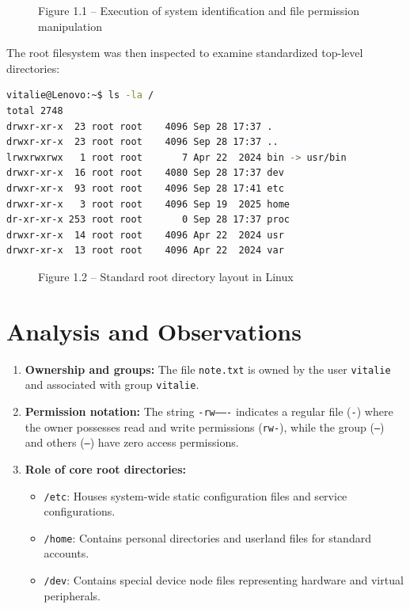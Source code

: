 \documentclass[12pt,a4paper]{report}
\numberwithin{equation}{chapter}
\numberwithin{figure}{chapter}
\numberwithin{table}{chapter}
\begin{document}
\begin{figure}[H]
\centering
\caption{Figure 1.1 -- Execution of system identification and file permission manipulation}
\end{figure}

The root filesystem was then inspected to examine standardized top-level directories:

\begin{lstlisting}[language=bash]
vitalie@Lenovo:~$ ls -la /
total 2748
drwxr-xr-x  23 root root    4096 Sep 28 17:37 .
drwxr-xr-x  23 root root    4096 Sep 28 17:37 ..
lrwxrwxrwx   1 root root       7 Apr 22  2024 bin -> usr/bin
drwxr-xr-x  16 root root    4080 Sep 28 17:37 dev
drwxr-xr-x  93 root root    4096 Sep 28 17:41 etc
drwxr-xr-x   3 root root    4096 Sep 19  2025 home
dr-xr-xr-x 253 root root       0 Sep 28 17:37 proc
drwxr-xr-x  14 root root    4096 Apr 22  2024 usr
drwxr-xr-x  13 root root    4096 Apr 22  2024 var
\end{lstlisting}

\begin{figure}[H]
\centering
\caption{Figure 1.2 -- Standard root directory layout in Linux}
\end{figure}

\section{Analysis and Observations}
\begin{enumerate}
    \item \textbf{Ownership and groups:} The file \texttt{note.txt} is owned by the user \texttt{vitalie} and associated with group \texttt{vitalie}.
    \item \textbf{Permission notation:} The string \texttt{-rw-------} indicates a regular file (\texttt{-}) where the owner possesses read and write permissions (\texttt{rw-}), while the group (\texttt{---}) and others (\texttt{---}) have zero access permissions.
    \item \textbf{Role of core root directories:}
    \begin{itemize}
        \item \texttt{/etc}: Houses system-wide static configuration files and service configurations.
        \item \texttt{/home}: Contains personal directories and userland files for standard accounts.
        \item \texttt{/dev}: Contains special device node files representing hardware and virtual peripherals.
    \end{itemize}
\end{enumerate}
\end{document}
